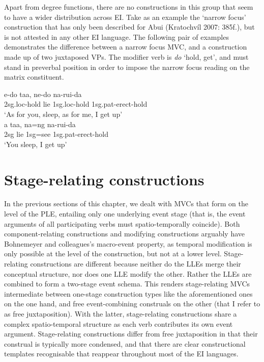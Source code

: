 Apart from degree functions, there are no constructions in this group that seem to have a wider distribution across EI. Take as an example the `narrow focus' construction that has only been described for Abui (Kratochvíl 2007: 385f.), but is not attested in any other EI language. The following pair of examples demonstrates the difference between a narrow focus MVC, and a construction made up of two juxtaposed VPs. The modifier verb is \textit{do} `hold, get', and must stand in preverbal position in order to impose the narrow focus reading on the matrix constituent.

\pex \label{Abui_99}
\a
\gll e-do taa, ne-do na-rui-da \\
2\acs{sg}.\acs{loc}-hold lie 1\acs{sg}.\acs{loc}-hold 1\acs{sg}.\acs{pat}-erect-hold \\
\glft `As for you, sleep, as for me, I get up’ \\ 
\z
\a
\gll a taa, na=ng na-rui-da \\ 
2\acs{sg} lie 1\acs{sg}=see 1\acs{sg}.\acs{pat}-erect-hold \\
\glft `You sleep, I get up’ \\ 
\z
\xe

\section{Stage-relating constructions}\label{sec:stage-relating}

In the previous sections of this chapter, we dealt with MVCs that form on the level of the PLE, entailing only one underlying event stage (that is, the event arguments of all participating verbs must spatio-temporally coincide). Both component-relating constructions and modifying constructions arguably have Bohnemeyer and colleagues's macro-event property, as temporal modification is only possible at the level of the construction, but not at a lower level. Stage-relating constructions are different because neither do the LLEs merge their conceptual structure, nor does one LLE modify the other. Rather the LLEs are combined to form a two-stage event schema. This renders stage-relating MVCs intermediate between one-stage construction types like the aforementioned ones on the one hand, and free event-combining construals on the other (that I refer to as free juxtaposition). With the latter, stage-relating constructions share a complex spatio-temporal structure as each verb contributes its own event argument. Stage-relating constructions differ from free juxtaposition in that their construal is typically more condensed, and that there are clear constructional templates recognisable that reappear throughout most of the EI languages.

